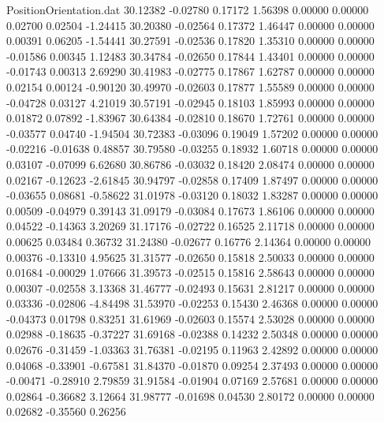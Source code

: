 \begin{filecontents}{PositionOrientation.dat}
  30.12382   -0.02780    0.17172     1.56398    0.00000    0.00000    0.02700    0.02504   -1.24415
  30.20380   -0.02564    0.17372     1.46447    0.00000    0.00000    0.00391    0.06205   -1.54441
  30.27591   -0.02536    0.17820     1.35310    0.00000    0.00000   -0.01586    0.00345    1.12483
  30.34784   -0.02650    0.17844     1.43401    0.00000    0.00000   -0.01743    0.00313    2.69290
  30.41983   -0.02775    0.17867     1.62787    0.00000    0.00000    0.02154    0.00124   -0.90120
  30.49970   -0.02603    0.17877     1.55589    0.00000    0.00000   -0.04728    0.03127    4.21019
  30.57191   -0.02945    0.18103     1.85993    0.00000    0.00000    0.01872    0.07892   -1.83967
  30.64384   -0.02810    0.18670     1.72761    0.00000    0.00000   -0.03577    0.04740   -1.94504
  30.72383   -0.03096    0.19049     1.57202    0.00000    0.00000   -0.02216   -0.01638    0.48857
  30.79580   -0.03255    0.18932     1.60718    0.00000    0.00000    0.03107   -0.07099    6.62680
  30.86786   -0.03032    0.18420     2.08474    0.00000    0.00000    0.02167   -0.12623   -2.61845
  30.94797   -0.02858    0.17409     1.87497    0.00000    0.00000   -0.03655    0.08681   -0.58622
  31.01978   -0.03120    0.18032     1.83287    0.00000    0.00000    0.00509   -0.04979    0.39143
  31.09179   -0.03084    0.17673     1.86106    0.00000    0.00000    0.04522   -0.14363    3.20269
  31.17176   -0.02722    0.16525     2.11718    0.00000    0.00000    0.00625    0.03484    0.36732
  31.24380   -0.02677    0.16776     2.14364    0.00000    0.00000    0.00376   -0.13310    4.95625
  31.31577   -0.02650    0.15818     2.50033    0.00000    0.00000    0.01684   -0.00029    1.07666
  31.39573   -0.02515    0.15816     2.58643    0.00000    0.00000    0.00307   -0.02558    3.13368
  31.46777   -0.02493    0.15631     2.81217    0.00000    0.00000    0.03336   -0.02806   -4.84498
  31.53970   -0.02253    0.15430     2.46368    0.00000    0.00000   -0.04373    0.01798    0.83251
  31.61969   -0.02603    0.15574     2.53028    0.00000    0.00000    0.02988   -0.18635   -0.37227
  31.69168   -0.02388    0.14232     2.50348    0.00000    0.00000    0.02676   -0.31459   -1.03363
  31.76381   -0.02195    0.11963     2.42892    0.00000    0.00000    0.04068   -0.33901   -0.67581
  31.84370   -0.01870    0.09254     2.37493    0.00000    0.00000   -0.00471   -0.28910    2.79859
  31.91584   -0.01904    0.07169     2.57681    0.00000    0.00000    0.02864   -0.36682    3.12664
  31.98777   -0.01698    0.04530     2.80172    0.00000    0.00000    0.02682   -0.35560    0.26256

\end{filecontents}
